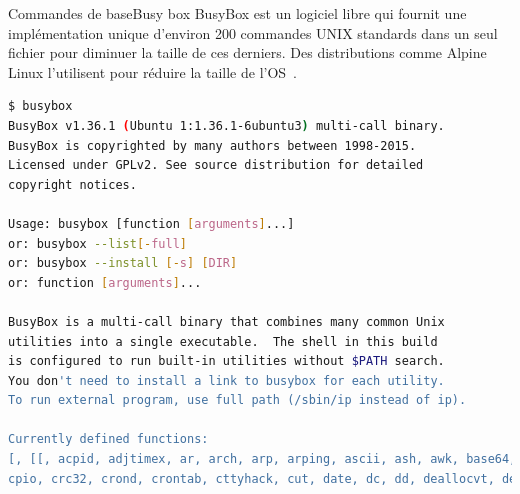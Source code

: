 \documentclass{beamer}
\begin{document}
    \begin{frame}[fragile]{Commandes de base}{Busy box}
        BusyBox est un logiciel libre qui fournit une implémentation unique d'environ 200 commandes UNIX standards dans un seul fichier pour diminuer la taille de ces derniers.
        Des distributions comme Alpine Linux l'utilisent pour réduire la taille de l'OS~.
        \begin{lstlisting}[language=bash,basicstyle=\tiny\ttfamily]
$ busybox
BusyBox v1.36.1 (Ubuntu 1:1.36.1-6ubuntu3) multi-call binary.
BusyBox is copyrighted by many authors between 1998-2015.
Licensed under GPLv2. See source distribution for detailed
copyright notices.

Usage: busybox [function [arguments]...]
or: busybox --list[-full]
or: busybox --install [-s] [DIR]
or: function [arguments]...

BusyBox is a multi-call binary that combines many common Unix
utilities into a single executable.  The shell in this build
is configured to run built-in utilities without $PATH search.
You don't need to install a link to busybox for each utility.
To run external program, use full path (/sbin/ip instead of ip).

Currently defined functions:
[, [[, acpid, adjtimex, ar, arch, arp, arping, ascii, ash, awk, base64, basename, bc, blkdiscard, blockdev, brctl, bunzip2, busybox, bzcat, bzip2, cal, cat, chgrp, chmod, chown, chpasswd, chroot, chvt, clear, cmp, cp,
cpio, crc32, crond, crontab, cttyhack, cut, date, dc, dd, deallocvt, depmod, devmem, df, diff, dirname, dmesg, dnsdomainname, dos2unix, dpkg, dpkg-deb, du, dumpkmap, dumpleases, echo, ed,
        \end{lstlisting}
    \end{frame}
\end{document}
